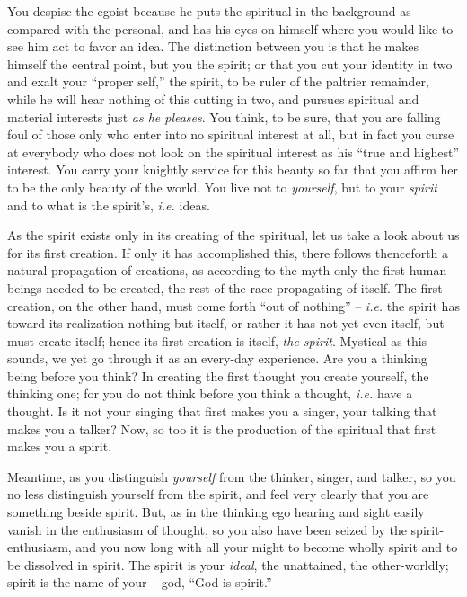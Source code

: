 \documentclass[12pt,a4paper]{book}
\begin{document}
You despise the egoist because he puts the spiritual in the background as 
compared with the personal, and has his eyes on himself where you would like 
to see him act to favor an idea. The distinction between you is that he makes 
himself the central point, but you the spirit; or that you cut your identity 
in two and exalt your ``proper self,'' the spirit, to be ruler of the 
paltrier remainder, while he will hear nothing of this cutting in two, and 
pursues spiritual and material interests just \textit{as he pleases}. You 
think, to be sure, that you are falling foul of those only who enter into no 
spiritual interest at all, but in fact you curse at everybody who does not 
look on the spiritual interest as his ``true and highest'' interest. You 
carry your knightly service for this beauty so far that you affirm her to be 
the only beauty of the world. You live not to \textit{yourself}, but to your 
\textit{spirit} and to what is the spirit's, \textit{i.e.} ideas.

As the spirit exists only in its creating of the spiritual, let us take a look 
about us for its first creation. If only it has accomplished this, there 
follows thenceforth a natural propagation of creations, as according to the 
myth only the first human beings needed to be created, the rest of the race 
propagating of itself. The first creation, on the other hand, must come forth 
``out of nothing'' -- \textit{i.e.} the spirit has toward its realization 
nothing but itself, or rather it has not yet even itself, but must create 
itself; hence its first creation is itself, \textit{the spirit}. Mystical as 
this sounds, we yet go through it as an every-day experience. Are you a 
thinking being before you think? In creating the first thought you create 
yourself, the thinking one; for you do not think before you think a thought, 
\textit{i.e.} have a thought. Is it not your singing that first makes you a 
singer, your talking that makes you a talker? Now, so too it is the production 
of the spiritual that first makes you a spirit.

Meantime, as you distinguish \textit{yourself} from the thinker, singer, and 
talker, so you no less distinguish yourself from the spirit, and feel very 
clearly that you are something beside spirit. But, as in the thinking ego 
hearing and sight easily vanish in the enthusiasm of thought, so you also have 
been seized by the spirit-enthusiasm, and you now long with all your might to 
become wholly spirit and to be dissolved in spirit. The spirit is your 
\textit{ideal}, the unattained, the other-worldly; spirit is the name of your 
-- god, ``God is spirit.''
\end{document}
